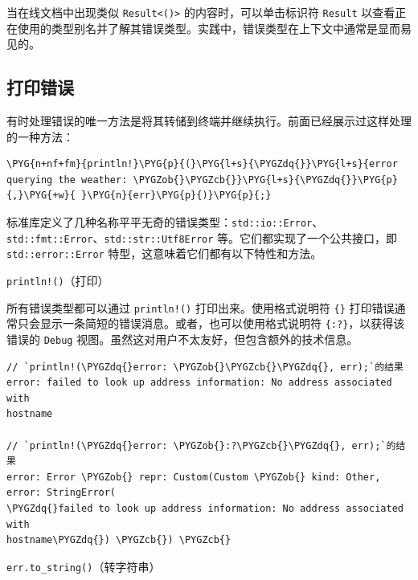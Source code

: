当在线文档中出现类似 \texttt{Result<()>} 的内容时，可以单击标识符 \texttt{Result} 以查看正在使用的类型别名并了解其错误类型。实践中，错误类型在上下文中通常是显而易见的。

\subsection{打印错误}

有时处理错误的唯一方法是将其转储到终端并继续执行。前面已经展示过这样处理的一种方法：

\begin{Verbatim}[commandchars=\\\{\},breaklines=true,breakanywhere=true,fontsize=\codefont,xleftmargin=17bp]
\PYG{n+nf+fm}{println!}\PYG{p}{(}\PYG{l+s}{\PYGZdq{}}\PYG{l+s}{error querying the weather: \PYGZob{}\PYGZcb{}}\PYG{l+s}{\PYGZdq{}}\PYG{p}{,}\PYG{+w}{ }\PYG{n}{err}\PYG{p}{)}\PYG{p}{;}
\end{Verbatim}

标准库定义了几种名称平平无奇的错误类型：\texttt{std::io::Error}、\texttt{std::fmt::Error}、\texttt{std::str::Utf8Error} 等。它们都实现了一个公共接口，即 \texttt{std::error::Error} 特型，这意味着它们都有以下特性和方法。

\begin{mySidenote}
\texttt{println!()}（打印）
\end{mySidenote}

所有错误类型都可以通过 \texttt{println!()} 打印出来。使用格式说明符 \texttt{\{\}} 打印错误通常只会显示一条简短的错误消息。或者，也可以使用格式说明符 \texttt{\{:?\}}，以获得该错误的 \texttt{Debug} 视图。虽然这对用户不太友好，但包含额外的技术信息。

\begin{Verbatim}[commandchars=\\\{\},breaklines=true,breakanywhere=true,fontsize=\codefont,xleftmargin=17bp]
// `println!(\PYGZdq{}error: \PYGZob{}\PYGZcb{}\PYGZdq{}, err);`的结果
error: failed to look up address information: No address associated with
hostname

// `println!(\PYGZdq{}error: \PYGZob{}:?\PYGZcb{}\PYGZdq{}, err);`的结果
error: Error \PYGZob{} repr: Custom(Custom \PYGZob{} kind: Other, error: StringError(
\PYGZdq{}failed to look up address information: No address associated with
hostname\PYGZdq{}) \PYGZcb{}) \PYGZcb{}
\end{Verbatim}

\begin{mySidenote}
\texttt{err.to\_string()}（转字符串）
\end{mySidenote}

